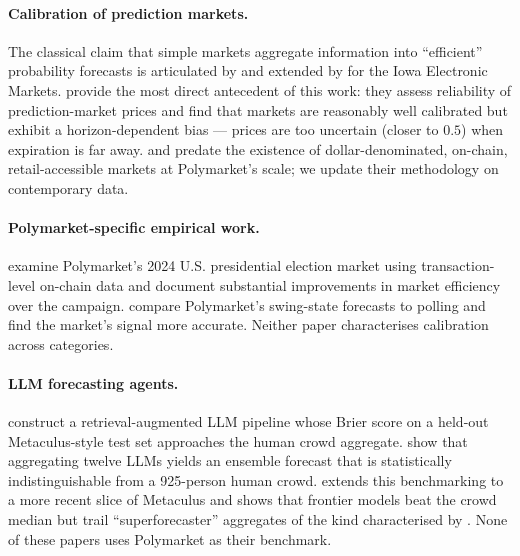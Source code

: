 \documentclass{article}
\begin{document}
\paragraph{Calibration of prediction markets.}
The classical claim that simple markets aggregate information into
``efficient'' probability forecasts is articulated by
\citet{wolfers2004} and extended by \citet{berg2008} for the Iowa
Electronic Markets. \citet{page2013} provide the most direct
antecedent of this work: they assess reliability of prediction-market
prices and find that markets are reasonably well calibrated but
exhibit a horizon-dependent bias --- prices are too uncertain (closer
to $0.5$) when expiration is far away. \citet{wolfers2004} and
\citet{berg2008} predate the existence of dollar-denominated,
on-chain, retail-accessible markets at Polymarket's scale; we update
their methodology on contemporary data.

\paragraph{Polymarket-specific empirical work.}
\citet{tsang2026anatomy} examine Polymarket's 2024 U.S. presidential
election market using transaction-level on-chain data and document
substantial improvements in market efficiency over the campaign.
\citet{cutting2025polling} compare Polymarket's swing-state forecasts
to polling and find the market's signal more accurate. Neither paper
characterises calibration across categories.

\paragraph{LLM forecasting agents.}
\citet{halawi2024} construct a retrieval-augmented LLM pipeline whose
Brier score on a held-out Metaculus-style test set approaches the
human crowd aggregate. \citet{schoenegger2024} show that aggregating
twelve LLMs yields an ensemble forecast that is statistically
indistinguishable from a 925-person human crowd. \citet{lu2025}
extends this benchmarking to a more recent slice of Metaculus and
shows that frontier models beat the crowd median but trail
``superforecaster'' aggregates of the kind characterised by
\citet{mellers2014}. None of these papers uses Polymarket
as their benchmark.
\end{document}
